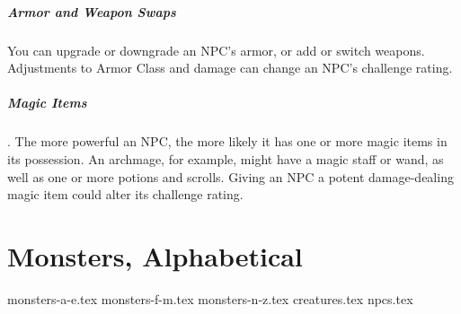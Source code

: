 \subparagraph*{Armor and Weapon Swaps} You can upgrade or downgrade an NPC's armor, or add or switch weapons. Adjustments to Armor Class and damage can change an NPC's challenge rating.

\subparagraph*{Magic Items}. The more powerful an NPC, the more likely it has one or more magic items in its possession. An archmage, for example, might have a magic staff or wand, as well as one or more potions and scrolls. Giving an NPC a potent damage-dealing magic item could alter its challenge rating.

\section{Monsters, Alphabetical}
{monsters-a-e.tex}
\FloatBarrier
{monsters-f-m.tex}
\FloatBarrier
{monsters-n-z.tex}
\FloatBarrier
{creatures.tex}
\FloatBarrier
{npcs.tex}
\FloatBarrier
